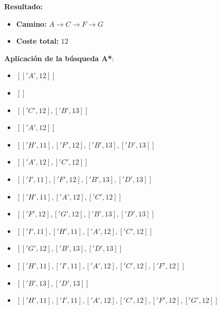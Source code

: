 \documentclass[11pt, a4paper]{article}
\newenvironment{problem}[1][Cuestión]{
	\vspace{0.5cm}
	\noindent{\Large\bfseries #1} \par\vspace{0.5cm}
}{
	\vspace{0.5cm}
}
\begin{document}
\begin{problem}[Cuestión 5 (30\%)]
{			\textbf{Resultado:}

			\begin{itemize}[label={}]
				\item \textbf{Camino:} $A \rightarrow C \rightarrow F \rightarrow G$
				\item \textbf{Coste total:} $12$
			\end{itemize}

			\vspace{2cm}

			\textbf{Aplicación de la búsqueda A*}:

			\begin{itemize}[label={}]
				\item $[['A', 12]]$
				\item $[]$

				\vspace{0.20cm}

				\item $[['C', 12], ['B', 13]]$
				\item $[['A', 12]]$

				\vspace{0.20cm}

				\item $[['H', 11], ['F', 12], ['B', 13], ['D', 13]]$
				\item $[['A', 12], ['C', 12]]$

				\vspace{0.20cm}

				\item $[['I', 11], ['F', 12], ['B', 13], ['D', 13]]$
				\item $[['H', 11], ['A', 12], ['C', 12]]$

				\vspace{0.20cm}

				\item $[['F', 12], ['G', 12], ['B', 13], ['D', 13]]$
				\item $[['I', 11], ['H', 11], ['A', 12], ['C', 12]]$

				\vspace{0.20cm}

				\item $[['G', 12], ['B', 13], ['D', 13]]$
				\item $[['H', 11], ['I', 11], ['A', 12], ['C', 12], ['F', 12]]$

				\vspace{0.20cm}

				\item $[['B', 13], ['D', 13]]$
				\item $[['H', 11], ['I', 11], ['A', 12], ['C', 12], ['F', 12], ['G', 12]]$
			\end{itemize}

}
\end{problem}
\end{document}
